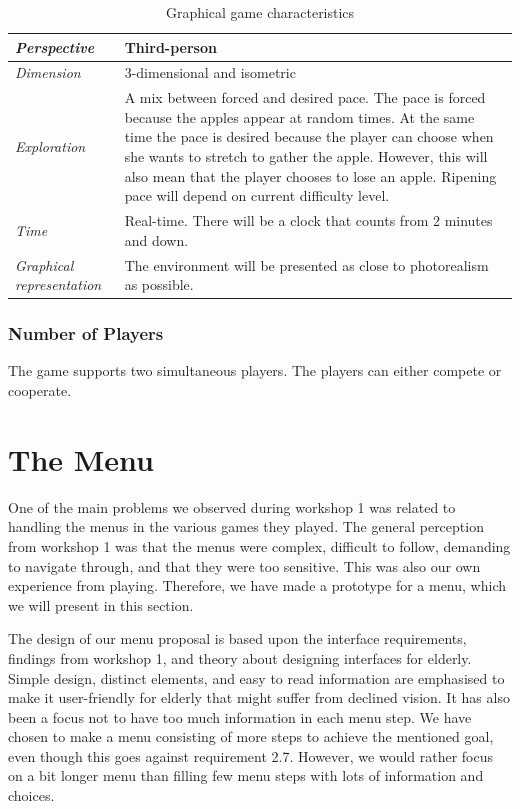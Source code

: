 \begin{table} [H]
\centering
    \begin{tabular}{|p{}|p{}|}
       \hline
      \emph {Perspective} & Third-person \\ \hline
       \emph{Dimension} &  3-dimensional and isometric \\ \hline
	       \emph{Exploration} &  A mix between forced and desired pace. The pace is forced because the apples appear at random times. At the same time the pace is desired because the player can choose when she wants to stretch to gather the apple. However, this will also mean that the player chooses to lose an apple. Ripening pace will depend on current difficulty level.\\ \hline
	       \emph{Time} & Real-time. There will be a clock that counts from 2 minutes and down. \\ \hline
	       \emph{Graphical representation} & The environment will be presented as close to photorealism as possible.  \\ \hline
    \end{tabular}
    \caption[Graphical game characteristics in the "Apple Picking" game]{Graphical game characteristics}
    \label{tab:graphical2}
\end{table}  

\subsubsection{Number of Players} 
The game supports two simultaneous players. The players can either compete or cooperate. 


\section{The Menu}
\label{sec:menu}

One of the main problems we observed during workshop 1 was related to handling the menus in the various games they played. The general perception from workshop 1 was that the menus were complex, difficult to follow, demanding to navigate through, and that they were too sensitive. This was also our own experience from playing. Therefore, we have made a prototype for a menu, which we will present in this section.

The design of our menu proposal is based upon the interface requirements, findings from workshop 1, and theory about designing interfaces for elderly. Simple design, distinct elements, and easy to read information are emphasised to make it user-friendly for elderly that might suffer from declined vision. It has also been a focus not to have too much information in each menu step. We have chosen to make a menu consisting of more steps to achieve the mentioned goal, even though this goes against requirement 2.7. However, we would rather focus on a bit longer menu than filling few menu steps with lots of information and choices.    


